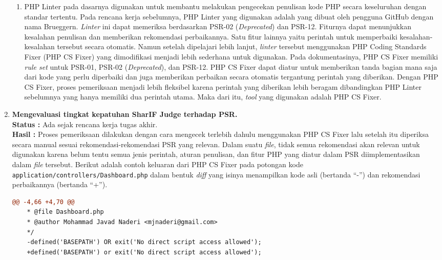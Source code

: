 \documentclass[a4paper,twoside]{article}
\begin{document}
\begin{enumerate}
\begin{enumerate}
			\item PHP Linter pada dasarnya digunakan untuk membantu melakukan pengecekan penulisan kode PHP secara keseluruhan dengan standar tertentu. Pada rencana kerja sebelumnya, PHP Linter yang digunakan adalah yang dibuat oleh pengguna GitHub dengan nama Brueggern. \textit{Linter} ini dapat memeriksa berdasarkan PSR-02 (\textit{Deprecated}) dan PSR-12. Fiturnya dapat menunjukkan kesalahan penulisan dan memberikan rekomendasi perbaikannya. Satu fitur lainnya yaitu perintah untuk memperbaiki kesalahan-kesalahan tersebut secara otomatis. Namun setelah dipelajari lebih lanjut, \textit{linter} tersebut menggunakan PHP Coding Standards Fixer (PHP CS Fixer) yang dimodifikasi menjadi lebih sederhana untuk digunakan. Pada dokumentasinya, PHP CS Fixer memiliki \textit{rule set} untuk PSR-01, PSR-02 (\textit{Deprecated}), dan PSR-12. PHP CS Fixer dapat diatur untuk memberikan tanda bagian mana saja dari kode yang perlu diperbaiki dan juga memberikan perbaikan secara otomatis tergantung perintah yang diberikan. Dengan PHP CS Fixer, proses pemeriksaan menjadi lebih fleksibel karena perintah yang diberikan lebih beragam dibandingkan PHP Linter sebelumnya yang hanya memiliki dua perintah utama. Maka dari itu, \textit{tool} yang digunakan adalah PHP CS Fixer. 
		\end{enumerate}
		
		
		\item \textbf{Mengevaluasi tingkat kepatuhan SharIF Judge terhadap PSR.}\\
		{\bf Status :} Ada sejak rencana kerja tugas akhir.\\
		{\bf Hasil :} Proses pemeriksaan dilakukan dengan cara mengecek terlebih dahulu menggunakan PHP CS Fixer lalu setelah itu diperiksa secara manual sesuai rekomendasi-rekomendasi PSR yang relevan. Dalam suatu \textit{file}, tidak semua rekomendasi akan relevan untuk digunakan karena belum tentu semua jenis perintah, aturan penulisan, dan fitur PHP yang diatur dalam PSR diimplementasikan dalam \textit{file} tersebut. Berikut adalah contoh keluaran dari PHP CS Fixer pada potongan kode \verb|application/controllers/Dashboard.php| dalam bentuk \textit{diff} yang isinya menampilkan kode asli (bertanda ``-'') dan rekomendasi perbaikannya (bertanda ``+''). 
\begin{lstlisting}[frame=single,language=diff]  
	@@ -4,66 +4,70 @@
	* @file Dashboard.php
	* @author Mohammad Javad Naderi <mjnaderi@gmail.com>
	*/
	-defined('BASEPATH') OR exit('No direct script access allowed');
	+defined('BASEPATH') or exit('No direct script access allowed');
	

\end{lstlisting}
\end{enumerate}
\end{document}

